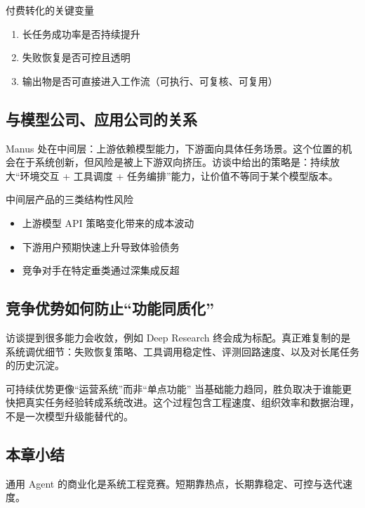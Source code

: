 \documentclass[a4paper]{article}
\begin{document}
\begin{importantbox}{付费转化的关键变量}
\begin{enumerate}
    \item 长任务成功率是否持续提升
    \item 失败恢复是否可控且透明
    \item 输出物是否可直接进入工作流（可执行、可复核、可复用）
\end{enumerate}
\end{importantbox}

\subsection{与模型公司、应用公司的关系}

Manus 处在中间层：上游依赖模型能力，下游面向具体任务场景。这个位置的机会在于系统创新，但风险是被上下游双向挤压。访谈中给出的策略是：持续放大“环境交互 + 工具调度 + 任务编排”能力，让价值不等同于某个模型版本。

\begin{warningbox}{中间层产品的三类结构性风险}
\begin{itemize}
    \item 上游模型 API 策略变化带来的成本波动
    \item 下游用户预期快速上升导致体验债务
    \item 竞争对手在特定垂类通过深集成反超
\end{itemize}
\end{warningbox}

\subsection{竞争优势如何防止“功能同质化”}

访谈提到很多能力会收敛，例如 Deep Research 终会成为标配。真正难复制的是系统调优细节：失败恢复策略、工具调用稳定性、评测回路速度、以及对长尾任务的历史沉淀。

\begin{knowledgebox}{可持续优势更像“运营系统”而非“单点功能”}
当基础能力趋同，胜负取决于谁能更快把真实任务经验转成系统改进。这个过程包含工程速度、组织效率和数据治理，不是一次模型升级能替代的。
\end{knowledgebox}

\subsection{本章小结}

通用 Agent 的商业化是系统工程竞赛。短期靠热点，长期靠稳定、可控与迭代速度。
\end{document}
